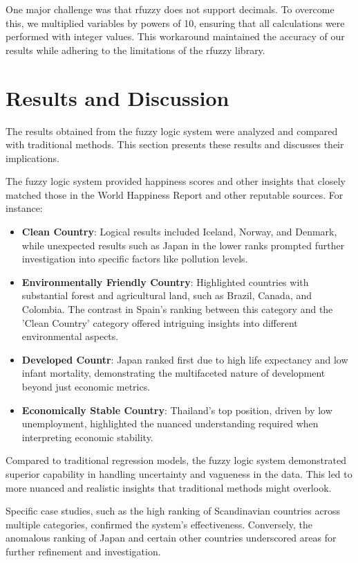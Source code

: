\documentclass[fleqn,11pt]{article}
\begin{document}
One major challenge was that rfuzzy does not support decimals. To overcome this, we multiplied variables by powers of 10, ensuring that all calculations were performed with integer values. This workaround maintained the accuracy of our results while adhering to the limitations of the rfuzzy library.

\section{Results and Discussion}

The results obtained from the fuzzy logic system were analyzed and compared with traditional methods. This section presents these results and discusses their implications.

The fuzzy logic system provided happiness scores and other insights that closely matched those in the World Happiness Report and other reputable sources. For instance:
\begin{itemize}
    \item \textbf{Clean Country}:  Logical results included Iceland, Norway, and Denmark, while unexpected results such as Japan in the lower ranks prompted further investigation into specific factors like pollution levels.
    \item \textbf{Environmentally Friendly Country}: Highlighted countries with substantial forest and agricultural land, such as Brazil, Canada, and Colombia. The contrast in Spain's ranking between this category and the 'Clean Country' category offered intriguing insights into different environmental aspects.
    \item \textbf{Developed Countr}: Japan ranked first due to high life expectancy and low infant mortality, demonstrating the multifaceted nature of development beyond just economic metrics.
    \item \textbf{Economically Stable Country}: Thailand's top position, driven by low unemployment, highlighted the nuanced understanding required when interpreting economic stability.
\end{itemize}
Compared to traditional regression models, the fuzzy logic system demonstrated superior capability in handling uncertainty and vagueness in the data. This led to more nuanced and realistic insights that traditional methods might overlook.

Specific case studies, such as the high ranking of Scandinavian countries across multiple categories, confirmed the system's effectiveness. Conversely, the anomalous ranking of Japan and certain other countries underscored areas for further refinement and investigation.
\end{document}
